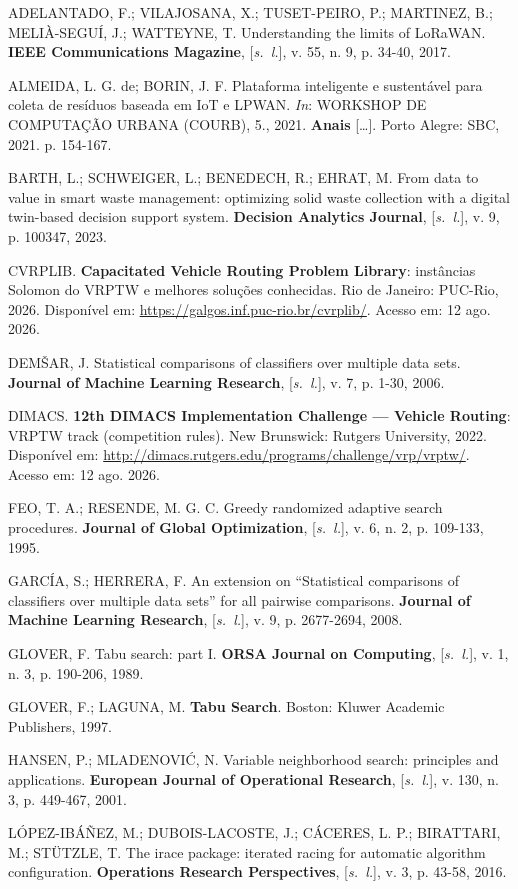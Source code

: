 \documentclass[10pt,a4paper]{article}
\newenvironment{referencias}
  {\begin{list}{}{\setlength{\leftmargin}{2.2em}\setlength{\itemsep}{\baselineskip}
     \setlength{\parsep}{0pt}\setlength{\topsep}{4pt}}
   \singlespacing\raggedright\sloppy}
  {\end{list}}
\newcommand{\referencia}{\item[]}
\begin{document}
\begin{referencias}
  \referencia ADELANTADO, F.; VILAJOSANA, X.; TUSET-PEIRO, P.; MARTINEZ, B.; MELI\`A-SEGU\'I, J.; WATTEYNE, T. Understanding the limits of LoRaWAN. \textbf{IEEE Communications Magazine}, [\textit{s.~l.}], v. 55, n. 9, p. 34-40, 2017.
  \referencia ALMEIDA, L. G. de; BORIN, J. F. Plataforma inteligente e sustentável para coleta de resíduos baseada em IoT e LPWAN. \textit{In}: WORKSHOP DE COMPUTAÇÃO URBANA (COURB), 5., 2021. \textbf{Anais} [\ldots]. Porto Alegre: SBC, 2021. p. 154-167.
  \referencia BARTH, L.; SCHWEIGER, L.; BENEDECH, R.; EHRAT, M. From data to value in smart waste management: optimizing solid waste collection with a digital twin-based decision support system. \textbf{Decision Analytics Journal}, [\textit{s.~l.}], v. 9, p. 100347, 2023.
  \referencia CVRPLIB. \textbf{Capacitated Vehicle Routing Problem Library}: instâncias Solomon do VRPTW e melhores soluções conhecidas. Rio de Janeiro: PUC-Rio, 2026. Disponível em: \url{https://galgos.inf.puc-rio.br/cvrplib/}. Acesso em: 12 ago. 2026.
  \referencia DEM\v{S}AR, J. Statistical comparisons of classifiers over multiple data sets. \textbf{Journal of Machine Learning Research}, [\textit{s.~l.}], v. 7, p. 1-30, 2006.
  \referencia DIMACS. \textbf{12th DIMACS Implementation Challenge --- Vehicle Routing}: VRPTW track (competition rules). New Brunswick: Rutgers University, 2022. Disponível em: \url{http://dimacs.rutgers.edu/programs/challenge/vrp/vrptw/}. Acesso em: 12 ago. 2026.
  \referencia FEO, T. A.; RESENDE, M. G. C. Greedy randomized adaptive search procedures. \textbf{Journal of Global Optimization}, [\textit{s.~l.}], v. 6, n. 2, p. 109-133, 1995.
  \referencia GARC\'IA, S.; HERRERA, F. An extension on ``Statistical comparisons of classifiers over multiple data sets'' for all pairwise comparisons. \textbf{Journal of Machine Learning Research}, [\textit{s.~l.}], v. 9, p. 2677-2694, 2008.
  \referencia GLOVER, F. Tabu search: part I. \textbf{ORSA Journal on Computing}, [\textit{s.~l.}], v. 1, n. 3, p. 190-206, 1989.
  \referencia GLOVER, F.; LAGUNA, M. \textbf{Tabu Search}. Boston: Kluwer Academic Publishers, 1997.
  \referencia HANSEN, P.; MLADENOVI\'C, N. Variable neighborhood search: principles and applications. \textbf{European Journal of Operational Research}, [\textit{s.~l.}], v. 130, n. 3, p. 449-467, 2001.
  \referencia L\'OPEZ-IB\'A\~NEZ, M.; DUBOIS-LACOSTE, J.; C\'ACERES, L. P.; BIRATTARI, M.; ST\"UTZLE, T. The irace package: iterated racing for automatic algorithm configuration. \textbf{Operations Research Perspectives}, [\textit{s.~l.}], v. 3, p. 43-58, 2016.

\end{referencias}
\end{document}

